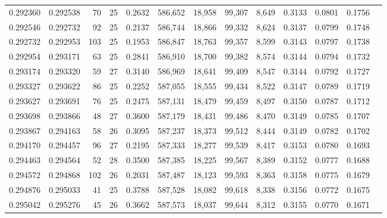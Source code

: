 \begin{tabular}{rrrrrrrrrrrrr}
0.292360 & 0.292538 &  70 &  25 &                                     0.2632 & 586,652 &  18,958 &  99,307 &   8,649 & 0.3133 & 0.0801 & 0.1756 \\
0.292546 & 0.292732 &  92 &  25 &                                     0.2137 & 586,744 &  18,866 &  99,332 &   8,624 & 0.3137 & 0.0799 & 0.1748 \\
0.292732 & 0.292953 & 103 &  25 &                                     0.1953 & 586,847 &  18,763 &  99,357 &   8,599 & 0.3143 & 0.0797 & 0.1738 \\
0.292954 & 0.293171 &  63 &  25 &                                     0.2841 & 586,910 &  18,700 &  99,382 &   8,574 & 0.3144 & 0.0794 & 0.1732 \\
0.293174 & 0.293320 &  59 &  27 &                                     0.3140 & 586,969 &  18,641 &  99,409 &   8,547 & 0.3144 & 0.0792 & 0.1727 \\
0.293327 & 0.293622 &  86 &  25 &                                     0.2252 & 587,055 &  18,555 &  99,434 &   8,522 & 0.3147 & 0.0789 & 0.1719 \\
0.293627 & 0.293691 &  76 &  25 &                                     0.2475 & 587,131 &  18,479 &  99,459 &   8,497 & 0.3150 & 0.0787 & 0.1712 \\
0.293698 & 0.293866 &  48 &  27 &                                     0.3600 & 587,179 &  18,431 &  99,486 &   8,470 & 0.3149 & 0.0785 & 0.1707 \\
0.293867 & 0.294163 &  58 &  26 &                                     0.3095 & 587,237 &  18,373 &  99,512 &   8,444 & 0.3149 & 0.0782 & 0.1702 \\
0.294170 & 0.294457 &  96 &  27 &                                     0.2195 & 587,333 &  18,277 &  99,539 &   8,417 & 0.3153 & 0.0780 & 0.1693 \\
0.294463 & 0.294564 &  52 &  28 &                                     0.3500 & 587,385 &  18,225 &  99,567 &   8,389 & 0.3152 & 0.0777 & 0.1688 \\
0.294572 & 0.294868 & 102 &  26 &                                     0.2031 & 587,487 &  18,123 &  99,593 &   8,363 & 0.3158 & 0.0775 & 0.1679 \\
0.294876 & 0.295033 &  41 &  25 &                                     0.3788 & 587,528 &  18,082 &  99,618 &   8,338 & 0.3156 & 0.0772 & 0.1675 \\
0.295042 & 0.295276 &  45 &  26 &                                     0.3662 & 587,573 &  18,037 &  99,644 &   8,312 & 0.3155 & 0.0770 & 0.1671 \\

\end{tabular}
